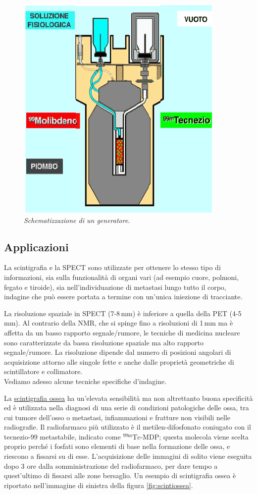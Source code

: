 \documentclass{report}
\newcommand{\figref}[1]{figura \ref{#1}}
\numberwithin{equation}{section}
\numberwithin{figure}{section}
\begin{document}
\begin{figure}[htp]
    \centering
    \includegraphics[scale=0.85]{immagini/mucca.png}
    \caption{\label{fig:mucca} \textit{Schematizzazione di un generatore}.}
\end{figure}

\subsection{Applicazioni}
La scintigrafia e la SPECT sono utilizzate per ottenere lo stesso tipo di informazioni, sia sulla funzionalità di organi vari (ad esempio cuore, polmoni, fegato e tiroide), sia nell'individuazione di metastasi lungo tutto il corpo, indagine che può essere portata a termine con un'unica iniezione di tracciante.

La risoluzione spaziale in SPECT (7-8\,mm) è inferiore a quella della PET (4-5\,mm). Al contrario della NMR, che si spinge fino a risoluzioni di 1\,mm ma è affetta da un basso rapporto segnale/rumore, le tecniche di medicina nucleare sono caratterizzate da bassa risoluzione spaziale ma alto rapporto segnale/rumore. La risoluzione dipende dal numero di posizioni angolari di acquisizione attorno alle singole fette e anche dalle proprietà geometriche di scintillatore e collimatore.\\
Vediamo adesso alcune tecniche specifiche d'indagine.

La \underline{scintigrafia ossea} ha un’elevata sensibilità ma non altrettanto buona specificità ed è utilizzata nella diagnosi di una serie di condizioni patologiche delle ossa, tra cui tumore dell'osso o metastasi, infiammazioni e fratture non visibili nelle radiografie. Il radiofarmaco più utilizzato è il metilen-difosfonato coniugato con il tecnezio-99 metastabile, indicato come $\mathrm{^{99m}Tc}$-MDP; questa molecola viene scelta proprio perché i fosfati sono elementi di base nella formazione delle ossa, e riescono a fissarsi su di esse. L'acquisizione delle immagini di solito viene eseguita dopo 3 ore dalla somministrazione del radiofarmaco, per dare tempo a quest'ultimo di fissarsi alle zone bersaglio. Un esempio di scintigrafia ossea è riportato nell'immagine di sinistra della \figref{fig:scintiossea}.
\end{document}
